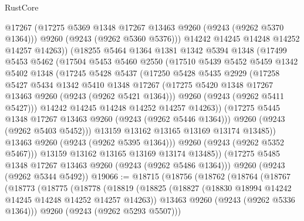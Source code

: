 \begin{lexlean}{RustCore}
\begin{coremodule}
                @17267
                (@17275 @5369 @1348 @17267 @13463 @9260 (@9243 (@9262 @5370 @1364)))
                @9260
                (@9243 (@9262 @5360 @5376)))
              @14242
              @14245
              @14248
              @14252
              @14257
              @14263))
          (@18255
            @5464
            @1364
            @1381
            @1342
            @5394
            @1348
            (@17499
              @5453
              @5462
              (@17504
                @5453
                @5460
                @2550
                (@17510
                  @5439
                  @5452
                  @5459
                  @1342
                  @5402
                  @1348
                  (@17245
                    @5428
                    @5437
                    (@17250
                      @5428
                      @5435
                      @2929
                      (@17258
                        @5427
                        @5434
                        @1342
                        @5410
                        @1348
                        @17267
                        (@17275 @5420 @1348 @17267 @13463 @9260 (@9243 (@9262 @5421 @1364)))
                        @9260
                        (@9243 (@9262 @5411 @5427)))
                      @14242
                      @14245
                      @14248
                      @14252
                      @14257
                      @14263))
                  (@17275 @5445 @1348 @17267 @13463 @9260 (@9243 (@9262 @5446 @1364)))
                  @9260
                  (@9243 (@9262 @5403 @5452)))
                @13159
                @13162
                @13165
                @13169
                @13174
                @13485))
            @13463
            @9260
            (@9243 (@9262 @5395 @1364)))
          @9260
          (@9243 (@9262 @5352 @5467)))
        @13159
        @13162
        @13165
        @13169
        @13174
        @13485))
    (@17275 @5485 @1348 @17267 @13463 @9260 (@9243 (@9262 @5486 @1364)))
    @9260
    (@9243 (@9262 @5344 @5492))
@19066 := @18715
    (@18756
      (@18762
        (@18764
          (@18767
            (@18773
              (@18775
                (@18778
                  (@18819
                    (@18825
                      (@18827 (@18830 @18994 @14242 @14245 @14248 @14252 @14257 @14263))
                      @13463
                      @9260
                      (@9243 (@9262 @5336 @1364)))
                    @9260
                    (@9243 (@9262 @5293 @5507)))

\end{coremodule}
\end{lexlean}
